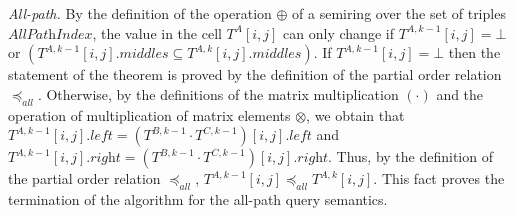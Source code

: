 \textit{All-path.} %
By the definition of the operation $\oplus$ of a semiring over the set of triples $\textit{AllPathIndex}$, the value in the cell $T^A[i, j]$ can only change if $T^{A, k - 1}[i, j] = \bot$ or $(T^{A, k - 1}[i, j].\textit{middles} \subseteq T^{A, k}[i, j].\textit{middles})$. If $T^{A, k - 1}[i, j] = \bot$ then the statement of the theorem is proved by the definition of the partial order relation $\preceq_{\textit{all}}$. Otherwise, by the definitions of the matrix multiplication $(\cdot)$ and the operation of multiplication of matrix elements $\otimes$, we obtain that $T^{A, k - 1}[i, j].\textit{left} = (T^{B, k - 1} \cdot T^{C, k - 1})[i, j].\textit{left}$ and $T^{A, k - 1}[i, j].\textit {right} = (T^{B, k - 1} \cdot T^{C, k - 1})[i, j].\textit{right}$. Thus, by the definition of the partial order relation $\preceq_{\textit{all}}$, $T^{A, k - 1}[i, j] \preceq_{\textit{all}} T^{A, k }[i, j]$. This fact proves the termination of the algorithm for the all-path query semantics.

